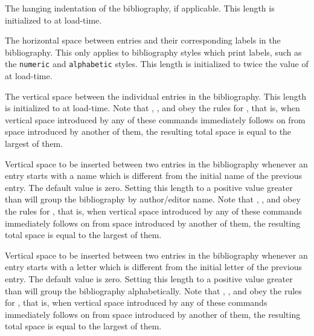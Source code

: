 \documentclass{ltxdockit}[2011/03/25]
\begin{document}
\begin{ltxsyntax}


The hanging indentation of the bibliography, if applicable. This length is initialized to  at load-time.


The horizontal space between entries and their corresponding labels in the bibliography. This only applies to bibliography styles which print labels, such as the \texttt{numeric} and \texttt{alphabetic} styles. This length is initialized to twice the value of  at load-time.


The vertical space between the individual entries in the bibliography. This length is initialized to  at load-time. Note that , , and  obey the rules for , that is, when vertical space introduced by any of these commands immediately follows on from space introduced by another of them, the resulting total space is equal to the largest of them.


Vertical space to be inserted between two entries in the bibliography whenever an entry starts with a name which is different from the initial name of the previous entry. The default value is zero. Setting this length to a positive value greater than  will group the bibliography by author\slash editor name. Note that , , and  obey the rules for , that is, when vertical space introduced by any of these commands immediately follows on from space introduced by another of them, the resulting total space is equal to the largest of them.


Vertical space to be inserted between two entries in the bibliography whenever an entry starts with a letter which is different from the initial letter of the previous entry. The default value is zero. Setting this length to a positive value greater than  will group the bibliography alphabetically. Note that , , and  obey the rules for , that is, when vertical space introduced by any of these commands immediately follows on from space introduced by another of them, the resulting total space is equal to the largest of them.


\end{ltxsyntax}
\end{document}
